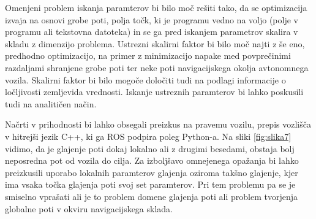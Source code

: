 Omenjeni problem iskanja paramterov bi bilo moč rešiti tako, da se optimizacija izvaja na osnovi grobe poti, polja točk, ki je programu vedno na voljo (polje v programu ali tekstovna datoteka) in se ga pred iskanjem parametrov skalira v skladu z dimenzijo problema. Ustrezni skalirni faktor bi bilo moč najti z še eno, predhodno optimizacijo, na primer z minimizacijo napake med povprečinimi razdaljami shranjene grobe poti ter neke poti navigacijskega okolja avtonomnega vozila. Skalirni faktor bi bilo mogoče določiti tudi na podlagi informacije o ločljivosti zemljevida vrednosti. Iskanje ustreznih paramterov bi lahko poskusili tudi na analitičen način.

Načrti v prihodnosti bi lahko obsegali preizkus na pravemu vozilu, prepis vozlišča v hitrejši jezik C++, ki ga ROS podpira poleg Python-a. Na sliki \ref{fig:slika7} vidimo, da je glajenje poti dokaj lokalno ali z drugimi besedami, obstaja bolj neposredna pot od vozila do cilja. Za izboljšavo omnejenega opažanja bi lahko preizkusili uporabo lokalnih paramterov glajenja oziroma takšno glajenje, kjer ima vsaka točka glajenja poti svoj set paramterov. Pri tem problemu pa se je smiselno vprašati ali je to problem domene glajenja poti ali problem tvorjenja globalne poti v okviru navigacijskega sklada.